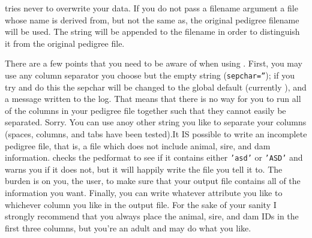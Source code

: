  tries never to overwrite your data. If you do not pass a filename argument a file whose name is derived from, but not the same as, the original pedigree filename will be used. The string  will be appended to the filename in order to distinguish it from the original pedigree file.

There are a few points that you need to be aware of when using . First, you may use any column separator you choose but the empty string
(\texttt{sepchar=''}); if you try and do this the sepchar will be changed to the global default (currently \samp{ }), and a message written to the log. That means
that there is no way for you to run all of the columns in your pedigree file together such that they cannot easily be separated. Sorry.  You can use anoy other string
you like to separate your columns (spaces, columns, and tabs have been tested).It IS possible to write an
incomplete pedigree file, that is, a file which does not include animal, sire, and dam information. \PyPedal{} checks the pedformat to see if it contains either
\texttt{'asd'} or \texttt{'ASD'} and warns you if it does not, but it will happily write the file you tell it to. The burden is on you, the user, to make sure that
your output file contains all of the information you want. Finally, you can write whatever attribute you like to whichever column you like in the output file. For the
sake of your sanity I strongly recommend that you always place the animal, sire, and dam IDs in the first three columns, but you're an adult and may do what you like.

